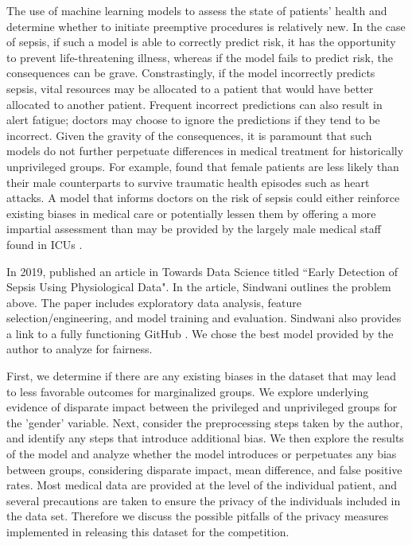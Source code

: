 \documentclass[10pt,letterpaper]{article}
\begin{document}
\par The use of machine learning models to assess the state of patients' health and determine whether to initiate preemptive procedures is relatively new. In the case of sepsis, if such a model is able to correctly predict risk, it has the opportunity to prevent life-threatening illness, whereas if the model fails to predict risk, the consequences can be grave. Constrastingly, if the model incorrectly predicts sepsis, vital resources may be allocated to a patient that would have better allocated to another patient. Frequent incorrect predictions can also result in alert fatigue; doctors may choose to ignore the predictions if they tend to be incorrect.  Given the gravity of the consequences, it is paramount that such models do not further perpetuate differences in medical treatment for historically unprivileged groups. For example, \citeauthor{Greenwood2018} found that female patients are less likely than their male counterparts to survive traumatic health episodes such as heart attacks. A model that informs doctors on the risk of sepsis could either reinforce existing biases in medical care or potentially lessen them by offering a more impartial assessment than may be provided by the largely male medical staff found in ICUs \cite{Chadwick2020}.

\par In 2019, \citeauthor{Sindwani2019} published an article in Towards Data Science titled “Early Detection of Sepsis Using Physiological Data". In the article, Sindwani outlines the problem above. The paper includes exploratory data analysis, feature selection/engineering, and model training and evaluation. Sindwani also provides a link to a fully functioning GitHub \cite{Karan2019}. We chose the best model provided by the author to analyze for fairness. 

\par First, we determine if there are any existing biases in the dataset that may lead to less favorable outcomes for marginalized groups. We explore underlying evidence of disparate impact between the privileged and unprivileged groups for the 'gender' variable. Next, consider the preprocessing steps taken by the author, and identify any steps that introduce additional bias. We then explore the results of the model and analyze whether the model introduces or perpetuates any bias between groups, considering disparate impact, mean difference, and false positive rates. Most medical data are provided at the level of the individual patient, and several precautions are taken to ensure the privacy of the individuals included in the data set. Therefore we discuss the possible pitfalls of the privacy measures implemented in releasing this dataset for the competition.
\end{document}
